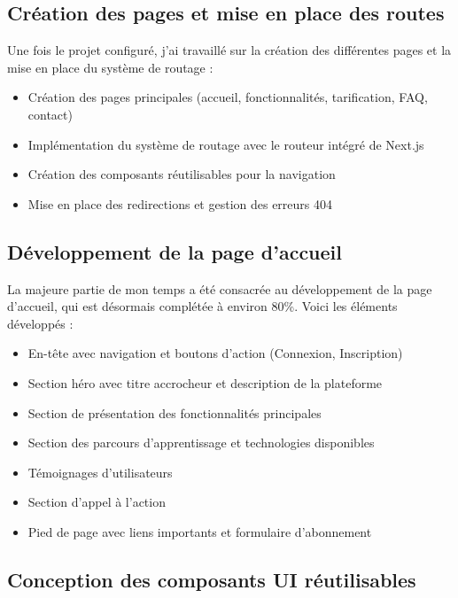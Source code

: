 \documentclass[12pt, a4paper]{article}
\begin{document}
\subsection{Création des pages et mise en place des routes}

Une fois le projet configuré, j'ai travaillé sur la création des différentes pages et la mise en place du système de routage :

\begin{itemize}
  \item Création des pages principales (accueil, fonctionnalités, tarification, FAQ, contact)
  \item Implémentation du système de routage avec le routeur intégré de Next.js
  \item Création des composants réutilisables pour la navigation
  \item Mise en place des redirections et gestion des erreurs 404
\end{itemize}

\subsection{Développement de la page d'accueil}

La majeure partie de mon temps a été consacrée au développement de la page d'accueil, qui est désormais complétée à environ 80\%. Voici les éléments développés :

\begin{itemize}
  \item En-tête avec navigation et boutons d'action (Connexion, Inscription)
  \item Section héro avec titre accrocheur et description de la plateforme
  \item Section de présentation des fonctionnalités principales
  \item Section des parcours d'apprentissage et technologies disponibles
  \item Témoignages d'utilisateurs
  \item Section d'appel à l'action
  \item Pied de page avec liens importants et formulaire d'abonnement
\end{itemize}

\subsection{Conception des composants UI réutilisables}
\end{document}
